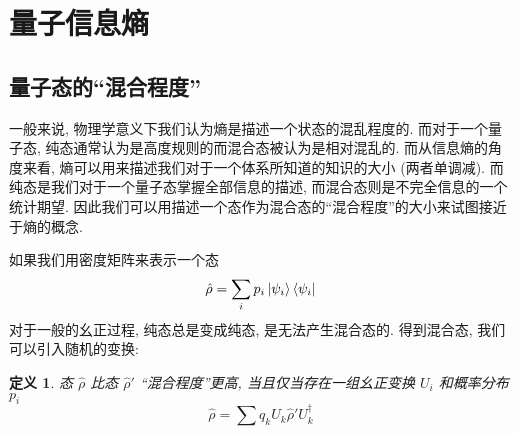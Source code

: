 \documentclass[12pt,a4paper]{article}
\newtheorem{definition}{定义}
\begin{document}


\section{量子信息熵} %
\label{sec:Quantum_entropy}
\subsection{量子态的``混合程度''} %
\label{sub:Intro_of_quantum_entropy}
    一般来说, 物理学意义下我们认为熵是描述一个状态的混乱程度的. 
    而对于一个量子态, 纯态通常认为是高度规则的而混合态被认为是相对混乱的.
    而从信息熵的角度来看, 熵可以用来描述我们对于一个体系所知道的知识的大小 
    (两者单调减). 而纯态是我们对于一个量子态掌握全部信息的描述, 
    而混合态则是不完全信息的一个统计期望\cite{ITSM2.PhysRev.108.171}. 
    因此我们可以用描述一个态作为混合态的``混合程度''的大小来试图接近于熵的概念. 

    如果我们用密度矩阵来表示一个态
    \begin{equation}
        \hat\rho  = \sum_i p_i\ket{\psi_i}\bra{\psi_i}
    \end{equation}
    对于一般的幺正过程, 纯态总是变成纯态, 是无法产生混合态的. 
    得到混合态, 我们可以引入随机的变换:
    \begin{definition}
        态 $\hat\rho$ 比态 $\hat\rho'$ ``混合程度''更高, 
        当且仅当存在一组幺正变换 $U_i$ 和概率分布 $p_i$
        \begin{equation}
            \hat\rho = \sum q_k U_k\hat\rho' U_k^\dagger
        \end{equation}
    \end{definition}
\end{document}
